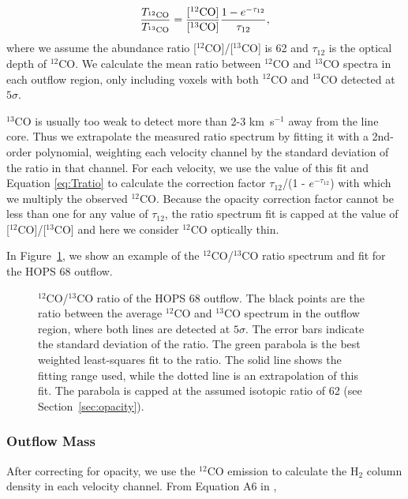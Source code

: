\documentclass[twocolumn]{aastex63}
\newcommand{\example}{HOPS 68}
\newcommand{\kms}{km~s$^{-1}$}
\newcommand{\co}[1][]{\ensuremath{^{#1}}CO}
\begin{document}
\begin{equation}\label{eq:Tratio}
\frac{T_{\rm \co[12]}}{T_{\rm \co[13]}} = \frac{[\rm{\co[12]}]}{[\rm{\co[13]}]} \frac{1 - e^{-\tau_{12}}}{\tau_{12}},
\end{equation}
where we assume the abundance ratio [\co[12]]/[\co[13]] is 62 \citep{Langer93} and $\tau_{12}$ is the optical depth of \co[12]{}. We calculate the mean ratio between \co[12]{} and \co[13]{} spectra in each outflow region, only including voxels with both \co[12]{} and \co[13]{} detected at $5\sigma$. 

\co[13]{} is usually too weak to detect more than 2-3 \kms{} away from the line core. Thus we extrapolate the measured ratio spectrum by fitting it with a 2nd-order polynomial, weighting each velocity channel by the standard deviation of the ratio in that channel. For each velocity, we use the value of this fit and Equation \ref{eq:Tratio} to calculate the correction factor $\tau_{12}$/(1 - $e^{-\tau_{12}}$) with which we multiply the observed \co[12]{}. Because the opacity correction factor cannot be less than one for any value of $\tau_{12}$, the ratio spectrum fit is capped at the value of [\co[12]]/[\co[13]] and here we consider \co[12]{} optically thin.

In Figure~\ref{fig:opacity}, we show an example of the \co[12]{}/\co[13]{} ratio spectrum and fit for the \example{} outflow. 

\begin{figure}
\caption{\co[12]{}/\co[13]{} ratio of the \example{} outflow. The black points are the ratio between the average \co[12]{} and \co[13]{} spectrum in the outflow region, where both lines are detected at $5\sigma$. The error bars indicate the standard deviation of the ratio. The green parabola is the best weighted least-squares fit to the ratio. The solid line shows the fitting range used, while the dotted line is an extrapolation of this fit. The parabola is capped at the assumed isotopic ratio of 62 (see Section~\ref{sec:opacity}).\label{fig:opacity}}
\end{figure}

\subsubsection{Outflow Mass}\label{sec:dmdv}
After correcting for opacity, we use the \co[12]{} emission to calculate the H$_2$ column density in each velocity channel. From Equation A6 in \citet{ZhangY16},
\end{document}
